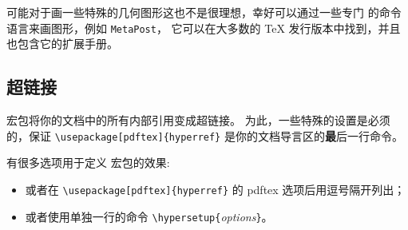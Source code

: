 可能对于画一些特殊的几何图形这也不是很理想，幸好可以通过一些专门
的命令语言来画图形，例如 \texttt{MetaPost}，
它可以在大多数的 \TeX{} 发行版本中找到，并且也包含它的扩展手册。

\subsection{超链接}
\label{ssec:pdfhyperref}


 宏包将你的文档中的所有内部引用变成超链接。
为此，一些特殊的设置是必须的，保证
\verb+\usepackage[pdftex]{hyperref}+ 是你的文档导言区的{\textbf
最后}一行命令。


有很多选项用于定义  宏包的效果:
\begin{itemize}
\item
或者在 \verb+\usepackage[pdftex]{hyperref}+ 的 pdftex 选项后用逗号隔开列出；
\item 或者使用单独一行的命令 \verb+\hypersetup{+\emph{options}\verb+}+。
\end{itemize}


